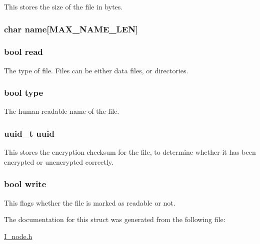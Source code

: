 This stores the size of the file in bytes. \hypertarget{structinode_af869a309a32425813b56b839f9659b24}{
\subsubsection[{name}]{\setlength{\rightskip}{0pt plus 5cm}char name\mbox{[}{\bf M\-A\-X\-\_\-\-N\-A\-M\-E\-\_\-\-L\-E\-N}\mbox{]}}}\label{structinode_af869a309a32425813b56b839f9659b24}
\hypertarget{structinode_af49a80be54293d8b153cd2a3dfd4e068}{
\subsubsection[{read}]{\setlength{\rightskip}{0pt plus 5cm}bool read}}\label{structinode_af49a80be54293d8b153cd2a3dfd4e068}
The type of file. Files can be either data files, or directories. \hypertarget{structinode_a565421f589059ae13581e05b505cf5f0}{
\subsubsection[{type}]{\setlength{\rightskip}{0pt plus 5cm}bool type}}\label{structinode_a565421f589059ae13581e05b505cf5f0}
The human-\/readable name of the file. \hypertarget{structinode_a0c9cfc131b27ae3b98b1533bba4c58ef}{
\subsubsection[{uuid}]{\setlength{\rightskip}{0pt plus 5cm}uuid\-\_\-t uuid}}\label{structinode_a0c9cfc131b27ae3b98b1533bba4c58ef}
This stores the encryption checksum for the file, to determine whether it has been encrypted or unencrypted correctly. \hypertarget{structinode_ab4d8d1259f524270d625ab8933700d27}{
\subsubsection[{write}]{\setlength{\rightskip}{0pt plus 5cm}bool write}}\label{structinode_ab4d8d1259f524270d625ab8933700d27}
This flags whether the file is marked as readable or not. 

The documentation for this struct was generated from the following file\-:\begin{DoxyCompactItemize}
\item 
\hyperlink{_i__node_8h}{I\-\_\-node.\-h}\end{DoxyCompactItemize}
